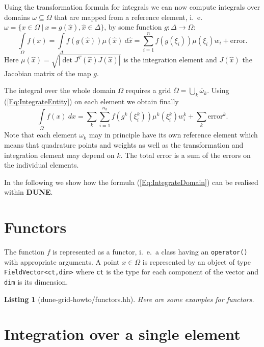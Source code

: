 \documentclass[11pt,a4paper,headinclude,footinclude,DIV16,normalheadings]{scrreprt}
\newcommand{\Dune}{{\sf\bfseries DUNE}\xspace}
\newtheorem{lst}{Listing}
\begin{document}
Using the transformation formula for integrals we can now compute
integrals over domains $\omega\subseteq\Omega$ that are mapped from a
reference element, i.~e.~$\omega=\{x\in\Omega\ |\
x=g(\hat{x}), \hat{x}\in\Delta\}$, by some function $g:\Delta\to\Omega$:
\begin{equation}
\int\limits_{\Omega} f(x) = \int\limits_{\Delta} f(g(\hat{x}))\mu(\hat{x})\
d\hat{x} = \sum_{i=1}^n f(g(\xi_i))\mu(\xi_i)w_i + \text{error}. 
\label{Eq:IntegrateEntity}
\end{equation}
Here $\mu(\hat{x}) = \sqrt{|\det J^T(\hat{x})J(\hat{x})|}$ is the
integration element and $J(\hat{x})$ the Jacobian matrix of the map $g$.

The integral over the whole domain $\Omega$ requires a grid
$\overline{\Omega}=\bigcup_k \overline{\omega}_k$. Using
(\ref{Eq:IntegrateEntity}) on each element we obtain finally
\begin{equation}
\int\limits_{\Omega} f(x)\ dx = \sum\limits_{k} \sum_{i=1}^{n_k}
f(g^k(\xi^k_i))\mu^k(\xi^k_i)w^k_i + \sum\limits_{k} \text{error}^k.
\label{Eq:IntegrateDomain}
\end{equation}
Note that each element $\omega_k$ may in principle have its own
reference element which means that quadrature points and weights as
well as the transformation and integration element may depend on
$k$. The total error is a sum of the errors on the individual
elements. 

In the following we show how the formula (\ref{Eq:IntegrateDomain})
can be realised within \Dune.


\section{Functors}

The function $f$ is represented as a functor, i.~e.~a class having an
\lstinline!operator()! with appropriate arguments. A point
$x\in\Omega$ is represented by an object of type
\lstinline!FieldVector<ct,dim>! where \lstinline!ct! is the type for
each component of the vector and \lstinline!dim! is its dimension.


\begin{lst}[dune-grid-howto/functors.hh] Here are some examples for functors.


\end{lst}


\section{Integration over a single element}
\end{document}
